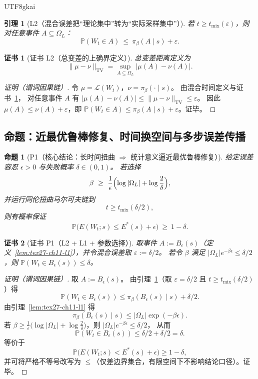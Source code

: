 \documentclass[12pt]{article}
\newtheorem{proposition}{命题}[section]
\newtheorem{lemma}{引理}[section]
\newtheorem{Certificate}{证书}[section]
\begin{document}
\begin{CJK*}{UTF8}{gkai}
\begin{lemma}[L2（混合误差把“理论集中”转为“实际采样集中”）]
\label{lem:tex27-ch11-l2}
若 $t\ge t_{\mathrm{mix}}(\varepsilon)$，则对任意事件 $A\subseteq\Omega_L$：
\[
  \mathbb{P}(W_t\in A)\ \le\ \pi_\beta(A\mid s)+\varepsilon.
\]
\end{lemma}

\begin{Certificate}[证书 L2（总变差的上确界定义）]
\label{cert:tex27-ch11-l2}
总变差距离定义为
\[
  \|\mu-\nu\|_{\mathrm{TV}}=\sup_{A\subseteq\Omega_L}|\mu(A)-\nu(A)|.
\]
\end{Certificate}

\begin{proof}[证明（谓词因果链）]
令 $\mu=\mathcal{L}(W_t)$，$\nu=\pi_\beta(\cdot\mid s)$。
由混合时间定义与证书~\ref{cert:tex27-ch11-l2}，
对任意事件 $A$ 有 $|\mu(A)-\nu(A)|\le \|\mu-\nu\|_{\mathrm{TV}}\le \varepsilon$。
因此 $\mu(A)\le \nu(A)+\varepsilon$，即
$\mathbb{P}(W_t\in A)\le \pi_\beta(A\mid s)+\varepsilon$。证毕。
\end{proof}

\subsection{命题：近最优鲁棒修复、时间换空间与多步误差传播}
\label{subsec:tex27-ch11-props}

\begin{proposition}[P1（核心结论：长时间扭曲 $\Rightarrow$ 统计意义逼近最优鲁棒修复）]
\label{prop:tex27-ch11-p1}
给定误差容忍 $\epsilon>0$ 与失败概率 $\delta\in(0,1)$。
若选择
\[
  \beta \ \ge\ \frac{1}{\epsilon}\Bigl(\log|\Omega_L|+\log\frac{2}{\delta}\Bigr),
\]
并运行同伦扭曲马尔可夫链到
\[
  t\ge t_{\mathrm{mix}}(\delta/2),
\]
则有概率保证
\[
  \mathbb{P}\bigl(E(W_t;s)\le E^\ast(s)+\epsilon\bigr)\ \ge\ 1-\delta.
\]
\end{proposition}

\begin{Certificate}[证书 P1（L2 + L1 + 参数选择）]
\label{cert:tex27-ch11-p1}
取事件 $A:=B_\epsilon(s)$（定义~\ref{lem:tex27-ch11-l1}），并令混合误差取 $\varepsilon:=\delta/2$。
若令 $\beta$ 满足 $|\Omega_L|e^{-\beta\epsilon}\le \delta/2$，则
$\mathbb{P}(W_t\in B_\epsilon(s))\le\delta$。
\end{Certificate}

\begin{proof}[证明（谓词因果链）]
取 $A:=B_\epsilon(s)$。
由引理~\ref{lem:tex27-ch11-l2}（取 $\varepsilon=\delta/2$ 且 $t\ge t_{\mathrm{mix}}(\delta/2)$）得
\[
  \mathbb{P}(W_t\in B_\epsilon(s))\le \pi_\beta(B_\epsilon(s)\mid s)+\delta/2.
\]
由引理~\ref{lem:tex27-ch11-l1} 得
\[
  \pi_\beta(B_\epsilon(s)\mid s)\le |\Omega_L|\exp(-\beta\epsilon).
\]
若 $\beta \ge \frac{1}{\epsilon}\bigl(\log|\Omega_L|+\log\frac{2}{\delta}\bigr)$，则 $|\Omega_L|e^{-\beta\epsilon}\le
  \delta/2$，
从而
\[
  \mathbb{P}(W_t\in B_\epsilon(s))\le \delta/2+\delta/2=\delta.
\]
等价于
\[
  \mathbb{P}\bigl(E(W_t;s)<E^\ast(s)+\epsilon\bigr)\ge 1-\delta,
\]
并可将严格不等号改写为 $\le$（仅差边界集合，有限空间下不影响结论口径）。证毕。
\end{proof}


\end{CJK*}
\end{document}
